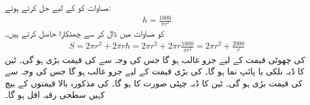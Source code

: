 مساوات  کو  کے لیے حل کرتے ہوئے:
\begin{align*}
h=\frac{1000}{\pi r^2}
\end{align*}
  کو مساوات  میں  ڈال کر   سے  چھٹکارا حاصل کرتے ہیں۔
\begin{align*}
S=2\pi r^2+2\pi rh=2\pi r^2+2\pi r\frac{1000}{\pi r^2}=2\pi r^2+\frac{2000}{r}
\end{align*}
 کی چھوٹی قیمت کے لیے  جزو غالب ہو گا جس کی وجہ سے  کی قیمت بڑی ہو گی۔ ٹین کا ڈبہ نلکی یا پائپ نما ہو گا۔  کی بڑی قیمت کے لیے  جزو غالب ہو گا جس کی وجہ سے  کی قیمت بڑی ہو گی۔ ٹین کا ڈبہ چپٹی صورت کا ہو گا۔  کی مذکورہ بالا قیمتوں کے بیچ کہیں سطحی رقبہ  اقل  ہو گا۔

